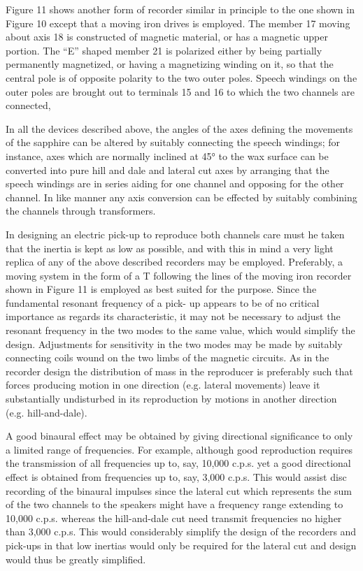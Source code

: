 \documentclass[11pt]{article}
\begin{document}
\begin{multicols*}{2}
Figure 11 shows another form of recorder similar in principle to the one shown in Figure 10 except that a moving iron drives is employed. The member 17 moving about axis 18 is constructed of magnetic material, or has a magnetic upper portion. The “E” shaped member 21 is polarized either by being partially permanently magnetized, or having a magnetizing winding on it, so that the central pole is of opposite polarity to the two outer poles. Speech windings on the outer poles are brought out to terminals 15 and 16 to which the two channels are connected, 

In all the devices described above, the angles of the axes defining the movements of the sapphire can be altered by suitably connecting the speech windings; for instance, axes which are normally inclined at 45° to the wax surface can be converted into pure hill and dale and lateral cut axes by arranging that the speech windings are in series aiding for one channel and opposing for the other channel. In like manner any axis conversion can be effected by suitably combining the channels through transformers. 

In designing an electric pick-up to  reproduce both channels care must he taken that the inertia is kept as low as possible, and with this in mind a very light replica of any of the above described recorders may be employed. Preferably, a moving system in the form of a T following the lines of the moving iron recorder shown in Figure 11 is employed as best suited for the purpose. Since the fundamental resonant frequency of a pick- up appears to be of no critical importance as regards its characteristic, it may not be necessary to adjust the resonant frequency in the two modes to the same value, which would simplify the design. Adjustments for sensitivity in the two modes may be made by suitably connecting coils wound on the two limbs of the magnetic circuits. As in the recorder design the distribution of mass in the reproducer is preferably such that forces producing motion in one direction (e.g. lateral movements) leave it substantially undisturbed in its reproduction by motions in another direction (e.g. hill-and-dale). 

A good binaural effect may be obtained by giving directional significance to only a limited range of frequencies. For example, although good reproduction requires the transmission of all frequencies up to, say, 10,000 c.p.s. yet a good directional effect is obtained from frequencies up to, say, 3,000 c.p.s. This would assist disc recording of the binaural impulses since the lateral cut which represents the sum of the two channels to the speakers might have a frequency range extending to 10,000 c.p.s. whereas the hill-and-dale cut need transmit frequencies no higher than 3,000 c.p.s. This would considerably simplify the design of the recorders and pick-ups in that low inertias would only be required for the lateral cut and design would thus be greatly simplified. 


\end{multicols*}
\end{document}
